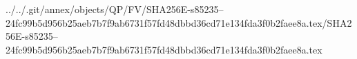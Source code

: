 ../../.git/annex/objects/QP/FV/SHA256E-s85235--24fc99b5d956b25aeb7b7f9ab6731f57fd48dbbd36cd71e134fda3f0b2faee8a.tex/SHA256E-s85235--24fc99b5d956b25aeb7b7f9ab6731f57fd48dbbd36cd71e134fda3f0b2faee8a.tex